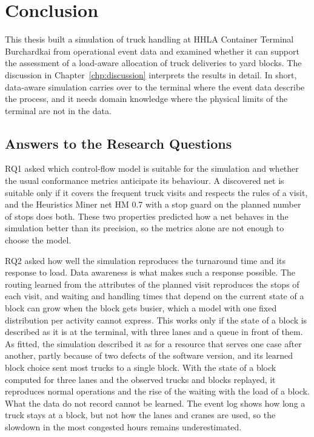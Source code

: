 \chapter{Conclusion}
\label{chp:conclusion}

This thesis built a simulation of truck handling at HHLA Container Terminal
Burchardkai from operational event data and examined whether it can support the
assessment of a load-aware allocation of truck deliveries to yard blocks. The
discussion in Chapter~\ref{chp:discussion} interprets the results in detail. In short,
data-aware simulation carries over to the terminal where the event data describe the
process, and it needs domain knowledge where the physical limits of the terminal are
not in the data.

\section{Answers to the Research Questions}
\label{sec:concl_rq}

RQ1 asked which control-flow model is suitable for the simulation and whether the
usual conformance metrics anticipate its behaviour. A discovered net is suitable only
if it covers the frequent truck visits and respects the rules of a visit, and the
Heuristics Miner net HM 0.7 with a stop guard on the planned number of stops does
both. These two properties predicted how a net behaves in the simulation better than
its precision, so the metrics alone are not enough to choose the model.

RQ2 asked how well the simulation reproduces the turnaround time and its response to
load. Data awareness is what makes such a response possible. The routing learned from
the attributes of the planned visit reproduces the stops of each visit, and waiting
and handling times that depend on the current state of a block can grow when the block
gets busier, which a model with one fixed distribution per activity cannot express.
This works only if the state of a block is described as it is at the terminal, with
three lanes and a queue in front of them. As fitted, the simulation described it as
for a resource that serves one case after another, partly because of two defects of
the software version, and its learned block choice sent most trucks to a single block.
With the state of a block computed for three lanes and the observed trucks and blocks
replayed, it reproduces normal operations and the rise of the waiting with the load of
a block. What the data do not record cannot be learned. The event log shows how long a
truck stays at a block, but not how the lanes and cranes are used, so the slowdown in
the most congested hours remains underestimated.

